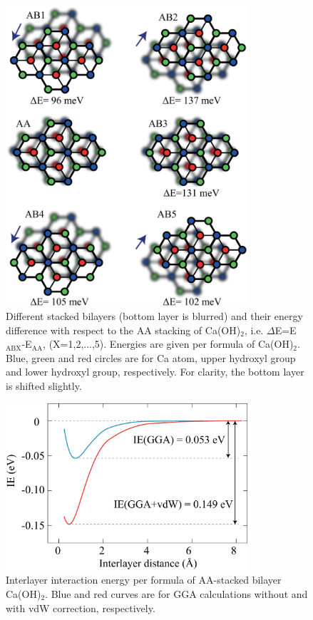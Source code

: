 \begin{figure}[htbp]
\centering
\includegraphics[width=0.8\textwidth]{stack_caoh2.eps}
\caption{\label{fig:stack_caoh2} Different stacked bilayers (bottom layer is blurred)
and their energy difference with respect to the AA stacking of Ca(OH)$_2$, i.e.
$\Delta$E=E$_{\text{ABX}}$-E$_{\text{AA}}$, (X=1,2,...,5). Energies are given
per formula of Ca(OH)$_2$. Blue, green and red circles are for Ca atom, 
upper hydroxyl group and lower hydroxyl group, respectively. For clarity, the 
bottom layer is shifted slightly.}
\end{figure}

\begin{figure}[htbp]
\centering
\includegraphics[width=0.8\textwidth]{int_caoh2.eps}
\caption{\label{fig:int_caoh2} Interlayer interaction energy per formula of
AA-stacked bilayer Ca(OH)$_2$. Blue and red curves are for GGA calculations
without and with vdW correction, respectively.}
\end{figure}

